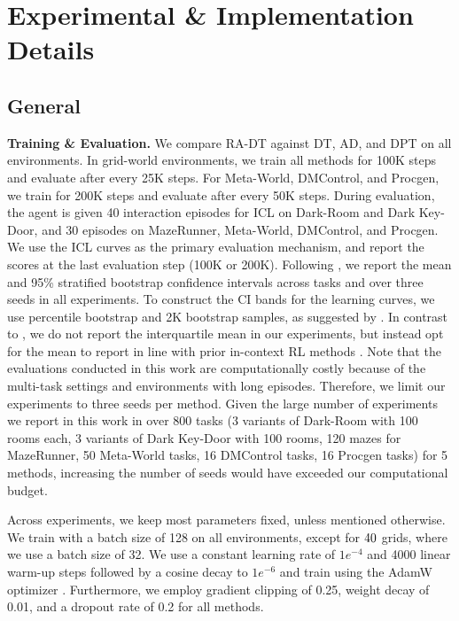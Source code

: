 \clearpage
\section{Experimental \& Implementation Details} \label{appendix:expdetails}
\subsection{General}\label{appendix:general}

\textbf{Training \& Evaluation.}
We compare RA-DT against DT, AD, and DPT on all environments. 
In grid-world environments, we train all methods for 100K steps and evaluate after every 25K steps. 
For Meta-World, DMControl, and Procgen, we train for 200K steps and evaluate after every 50K steps. 
During evaluation, the agent is given 40 interaction episodes for ICL on Dark-Room and Dark Key-Door, and 30 episodes on MazeRunner, Meta-World, DMControl, and Procgen.
We use the ICL curves as the primary evaluation mechanism, and report the scores at the last evaluation step (100K or 200K).
Following \citet{Agarwal:21}, we report the mean and 95\% stratified bootstrap confidence intervals across tasks and over three seeds in all experiments. 
To construct the CI bands for the learning curves, we use percentile bootstrap and 2K bootstrap samples, as suggested by \cite{Agarwal:21}.
In contrast to \citet{Agarwal:21}, we do not report the interquartile mean in our experiments, but instead opt for the mean to report in line with prior in-context RL methods \citep{Laskin:22,Lee:23}. 
Note that the evaluations conducted in this work are computationally costly because of the multi-task settings and environments with long episodes.
Therefore, we limit our experiments to three seeds per method.
Given the large number of experiments we report in this work in over 800 tasks (3 variants of Dark-Room with 100 rooms each, 3 variants of Dark Key-Door with 100 rooms, 120 mazes for MazeRunner, 50 Meta-World tasks, 16 DMControl tasks, 16 Procgen tasks) for 5 methods, increasing the number of seeds would have exceeded our computational budget. 

Across experiments, we keep most parameters fixed, unless mentioned otherwise.
We train with a batch size of 128 on all environments, except for $40\time20$ grids, where we use a batch size of 32.
We use a constant learning rate of $1e^{-4}$ and 4000 linear warm-up steps followed by a cosine decay to $1e^{-6}$ and train using the AdamW optimizer \citep{Loshchilov:18}.
Furthermore, we employ gradient clipping of 0.25, weight decay of 0.01, and a dropout rate of 0.2 for all methods.

